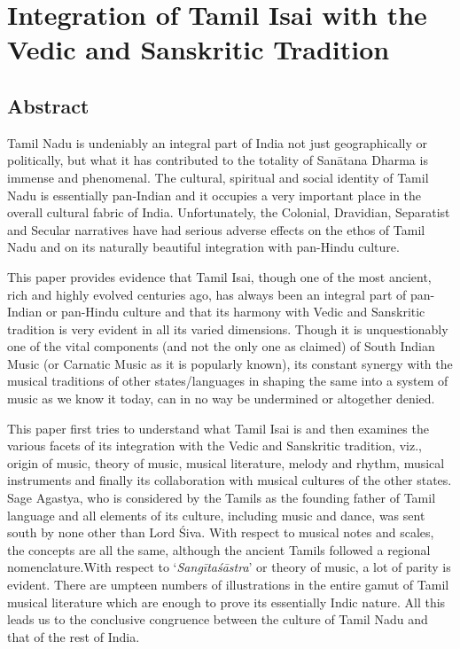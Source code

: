 
\chapter{Integration of Tamil Isai with the Vedic and Sanskritic Tradition}\label{chapter7}



\section*{Abstract}

Tamil Nadu is undeniably an integral part of India not just geographically or politically, but what it has contributed to the totality of Sanātana Dharma is immense and phenomenal. The cultural, spiritual and social identity of Tamil Nadu is essentially pan-Indian and it occupies a very important place in the overall cultural fabric of India. Unfortunately, the Colonial, Dravidian, Separatist and Secular narratives have had serious adverse effects on the ethos of Tamil Nadu and on its naturally beautiful integration with pan-Hindu culture.

This paper provides evidence that Tamil Isai, though one of the most ancient, rich and highly evolved centuries ago, has always been an integral part of pan-Indian or pan-Hindu culture and that its harmony with Vedic and Sanskritic tradition is very evident in all its varied dimensions. Though it is unquestionably one of the vital components (and not the only one as claimed) of South Indian Music (or Carnatic Music as it is popularly known), its constant synergy with the musical traditions of other states/languages in shaping the same into a system of music as we know it today, can in no way be undermined or altogether denied.

\newpage

This paper first tries to understand what Tamil Isai is and then examines the various facets of its integration with the Vedic and Sanskritic tradition, viz., origin of music, theory of music, musical literature, melody and rhythm, musical instruments and finally its collaboration with musical cultures of the other states. Sage Agastya, who is considered by the Tamils as the founding father of Tamil language and all elements of its culture, including music and dance, was sent south by none other than Lord Śiva. With respect to musical notes and scales, the concepts are all the same, although the ancient Tamils followed a regional nomenclature.With respect to ‘\textit{Sangītaśāstra}’ or theory of music, a lot of parity is evident. There are umpteen numbers of illustrations in the entire gamut of Tamil musical literature which are enough to prove its essentially Indic nature. All this leads us to the conclusive congruence between the culture of Tamil Nadu and that of the rest of India.


